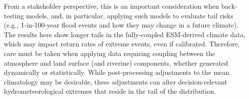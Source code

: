 \documentclass[nhess, manuscript]{copernicus}
\begin{document}
From a stakeholder perspective, this is an important consideration when back-testing models, and, in particular, applying such models to evaluate tail risks (e.g., 1-in-100-year flood events and how they may change in a future climate).
The results here show longer tails in the fully-coupled ESM-derived climate data, which may impact return rates of extreme events, even if calibrated.
Therefore, care must be taken when applying data requiring coupling between the atmosphere and land surface (and riverine) components, whether generated dynamically or statistically.
While post-processing adjustments to the mean climatology may be desirable, these adjustments can alter decision-relevant hydrometeorological extremes that reside in the tail of the distribution.







%
%
%
%
%
%
%
%
%
%
\end{document}
